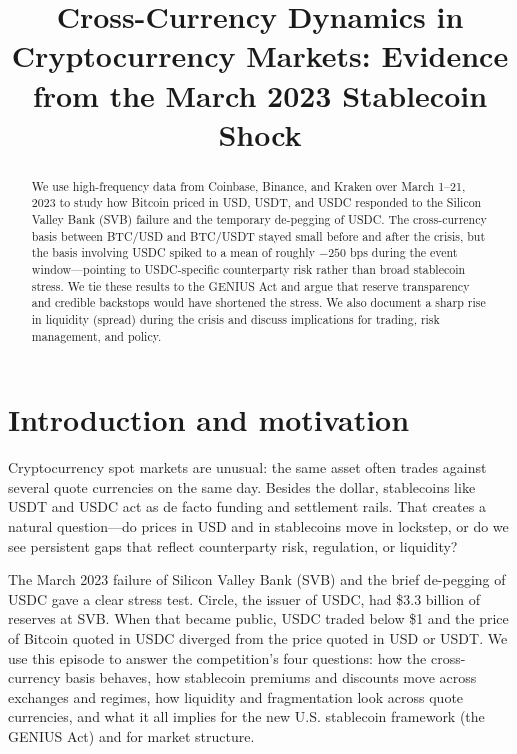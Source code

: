\documentclass[12pt,oneside,a4paper]{article}
\title{Cross-Currency Dynamics in Cryptocurrency Markets: Evidence from the March 2023 Stablecoin Shock}
\author{} %
\date{}
\begin{document}
\maketitle

\begin{abstract}
We use high-frequency data from Coinbase, Binance, and Kraken over March 1--21, 2023 to study how Bitcoin priced in USD, USDT, and USDC responded to the Silicon Valley Bank (SVB) failure and the temporary de-pegging of USDC. The cross-currency basis between BTC/USD and BTC/USDT stayed small before and after the crisis, but the basis involving USDC spiked to a mean of roughly $-250$ bps during the event window---pointing to USDC-specific counterparty risk rather than broad stablecoin stress. We tie these results to the GENIUS Act and argue that reserve transparency and credible backstops would have shortened the stress. We also document a sharp rise in liquidity (spread) during the crisis and discuss implications for trading, risk management, and policy.
\end{abstract}

\section{Introduction and motivation}

Cryptocurrency spot markets are unusual: the same asset often trades against several quote currencies on the same day. Besides the dollar, stablecoins like USDT and USDC act as de facto funding and settlement rails. That creates a natural question---do prices in USD and in stablecoins move in lockstep, or do we see persistent gaps that reflect counterparty risk, regulation, or liquidity?

The March 2023 failure of Silicon Valley Bank (SVB) and the brief de-pegging of USDC gave a clear stress test. Circle, the issuer of USDC, had \$3.3 billion of reserves at SVB. When that became public, USDC traded below \$1 and the price of Bitcoin quoted in USDC diverged from the price quoted in USD or USDT. We use this episode to answer the competition's four questions: how the cross-currency basis behaves, how stablecoin premiums and discounts move across exchanges and regimes, how liquidity and fragmentation look across quote currencies, and what it all implies for the new U.S. stablecoin framework (the GENIUS Act) and for market structure.
\end{document}
